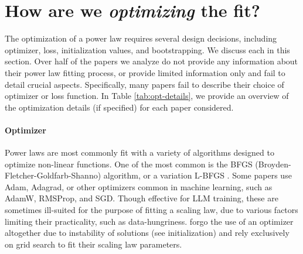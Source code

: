 
\section{How are we \emph{optimizing} the fit?}\label{sec:opt}


The optimization of a power law requires several design decisions, including optimizer, loss, initialization values, and bootstrapping. We discuss each in this section. Over half of the papers we analyze do not provide any information about their power law fitting process, or provide limited information only and fail to detail crucial aspects. Specifically, many papers fail to describe their choice of optimizer or loss function. In Table \ref{tab:opt-details}, we provide an overview of the optimization details (if specified) for each paper considered.



\paragraph{Optimizer}


Power laws are most commonly fit with a variety of algorithms designed to optimize non-linear functions. One of the most common is the BFGS (Broyden-Fletcher-Goldfarb-Shanno) algorithm, or a variation L-BFGS \citep{liu1989limited}.
Some papers \citep{hashimoto2021model,covert2024scaling} use Adam, Adagrad, or other optimizers common in machine learning, such as AdamW, RMSProp, and SGD. Though effective for LLM training, these are sometimes ill-suited for the purpose of fitting a scaling law, due to various factors limiting their practicality, such as data-hungriness. \citet{goyal2024scaling} forgo the use of an optimizer altogether due to instability of solutions (see initialization) and rely exclusively on grid search to fit their scaling law parameters.

